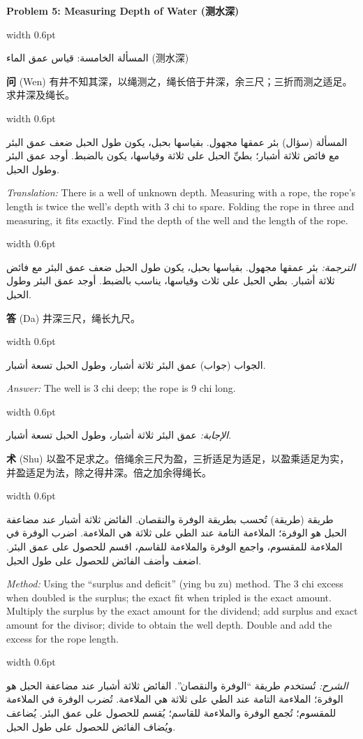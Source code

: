 \documentclass[11pt,a4paper]{article}
\newlength{\cnwidth}
\newlength{\arwidth}
\newcommand{\paralleltext}[2]{%
  \par\medskip\noindent
  \begin{minipage}[t]{\cnwidth}%
    \small #1%
  \end{minipage}%
  \hfill\textcolor{colrule}{\vrule width 0.6pt}\hfill
  \begin{minipage}[t]{\arwidth}%
    \small\arabicfont\beginR #2\endR%
  \end{minipage}%
  \par\medskip
}
\newcommand{\parallelsubsection}[2]{%
  \par\medskip\noindent
  \begin{minipage}[t]{\cnwidth}%
    \large\bfseries\color{sectioncolor} #1%
  \end{minipage}%
  \hfill\textcolor{colrule}{\vrule width 0.6pt}\hfill
  \begin{minipage}[t]{\arwidth}%
    \large\arabicfontbf\color{sectioncolor}\beginR #2\endR%
  \end{minipage}%
  \par\smallskip
}
\newcommand{\cnlabel}[1]{\textbf{\color{notecolor}#1}}
\newcommand{\arlabel}[1]{\arabicfontbf\color{notecolor}\beginR #1\endR}
\begin{document}
\parallelsubsection{Problem 5: Measuring Depth of Water (测水深)}{المسألة الخامسة: قياس عمق الماء (测水深)}

\paralleltext{%
\cnlabel{问} (Wen) 有井不知其深，以绳测之，绳长倍于井深，余三尺；三折而测之适足。求井深及绳长。
}{%
\arlabel{المسألة} (سؤال) بئر عمقها مجهول. بقياسها بحبل، يكون طول الحبل ضعف عمق البئر مع فائض ثلاثة أشبار؛ بطيِّ الحبل على ثلاثة وقياسها، يكون بالضبط. أوجد عمق البئر وطول الحبل.
}

\paralleltext{%
\textit{Translation:} There is a well of unknown depth. Measuring with a rope, the rope's length is twice the well's depth with 3 chi to spare. Folding the rope in three and measuring, it fits exactly. Find the depth of the well and the length of the rope.
}{%
\textit{الترجمة:} بئر عمقها مجهول. بقياسها بحبل، يكون طول الحبل ضعف عمق البئر مع فائض ثلاثة أشبار. بطي الحبل على ثلاث وقياسها، يناسب بالضبط. أوجد عمق البئر وطول الحبل.
}

\paralleltext{%
\cnlabel{答} (Da) 井深三尺，绳长九尺。
}{%
\arlabel{الجواب} (جواب) عمق البئر ثلاثة أشبار، وطول الحبل تسعة أشبار.
}

\paralleltext{%
\textit{Answer:} The well is 3 chi deep; the rope is 9 chi long.
}{%
\textit{الإجابة:} عمق البئر ثلاثة أشبار، وطول الحبل تسعة أشبار.
}

\paralleltext{%
\cnlabel{术} (Shu) 以盈不足求之。倍绳余三尺为盈，三折适足为适足，以盈乘适足为实，并盈适足为法，除之得井深。倍之加余得绳长。
}{%
\arlabel{طريقة} (طريقة) تُحسب بطريقة الوفرة والنقصان. الفائض ثلاثة أشبار عند مضاعفة الحبل هو الوفرة؛ الملاءمة التامة عند الطي على ثلاثة هي الملاءمة. اضرب الوفرة في الملاءمة للمقسوم، واجمع الوفرة والملاءمة للقاسم، اقسم للحصول على عمق البئر. اضعف وأضف الفائض للحصول على طول الحبل.
}

\paralleltext{%
\textit{Method:} Using the ``surplus and deficit'' (ying bu zu) method. The 3 chi excess when doubled is the surplus; the exact fit when tripled is the exact amount. Multiply the surplus by the exact amount for the dividend; add surplus and exact amount for the divisor; divide to obtain the well depth. Double and add the excess for the rope length.
}{%
\textit{الشرح:} تُستخدم طريقة ``الوفرة والنقصان''. الفائض ثلاثة أشبار عند مضاعفة الحبل هو الوفرة؛ الملاءمة التامة عند الطي على ثلاثة هي الملاءمة. تُضرب الوفرة في الملاءمة للمقسوم؛ تُجمع الوفرة والملاءمة للقاسم؛ يُقسم للحصول على عمق البئر. يُضاعف ويُضاف الفائض للحصول على طول الحبل.
}
\end{document}
